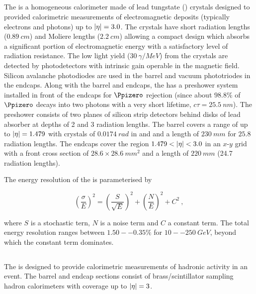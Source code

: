 \subsection{\ECAL}

The \ECAL is a homogeneous calorimeter made of lead tungstate (\pbwo) crystals
designed to provided calorimetric measurements of electromagnetic deposits
(typically electrons and photons) up to ${|\eta|=3.0}$. The crystals have
short radiation lengths (${\SI{0.89}{cm}}$) and Moliere lengths
(${\SI{2.2}{cm}}$) allowing a compact design which absorbs a significant
portion of electromagnetic energy with a satisfactory level of radiation
resistance. The low light yield (${\SI{30}{\gamma/MeV}}$) from the crystals are
detected by photodetectors with intrinsic gain operable in the magnetic field.
Silicon avalanche photodiodes are used in the barrel and vacuum phototriodes in
the endcaps. Along with the barrel and endcaps, the \ECAL has a preshower system
installed in front of the endcaps for ${\Ppizero}$ rejection (since about
${98.8\%}$ of ${\Ppizero}$ decays into two photons with a very short lifetime,
${c\tau=\SI{25.5}{nm}}$). The preshower consists of two planes of silicon strip
detectors behind disks of lead absorber at depths of 2 and 3 radiation lengths.
The barrel covers a range of up to ${|\eta|=1.479}$ with crystals of
${\SI{0.0174}{rad}}$ in \dphi and \deta and a length of ${\SI{230}{mm}}$ for
$25.8$ radiation lengths. The endcaps cover the region ${1.479<\aeta<3.0}$ in
an $x$-$y$ grid with a front cross section of ${28.6\times\SI{28.6}{mm^2}}$ and
a length of ${\SI{220}{mm}}$ (24.7 radiation lengths).

The energy resolution of the \ECAL is parameterised by

\begin{equation}
    \left(\frac{\sigma}{E}\right)^{2} = \left(\frac{S}{\sqrt{E}} \right)^{2}
    + \left( \frac{N}{E} \right)^{2} + C^2\ ,
\end{equation}

where $S$ is a stochastic tern, $N$ is a noise term and $C$ a constant term.
The total energy resolution ranges between ${1.50--0.35\%}$ for
${10--\SI{250}{GeV}}$, beyond which the constant term dominates.

\subsection{\HCAL}

The \HCAL is designed to provide calorimetric measurements of hadronic activity
in an event. The barrel and endcap sections consist of brass/scintillator
sampling hadron calorimeters with coverage up to ${|\eta|=3}$.

